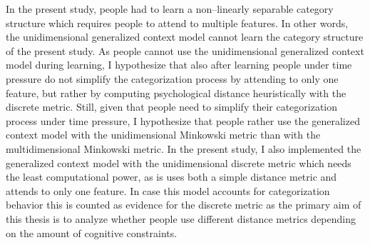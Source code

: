 \documentclass[a4paper,man,natbib]{apa6}
\begin{document}
In the present study, people had to learn a non--linearly separable category structure which requires people to attend to multiple features. In other words, the unidimensional generalized context model cannot learn the category structure of the present study. As people cannot use the unidimensional generalized context model during learning, I hypothesize that also after learning people under time pressure do not simplify the categorization process by attending to only one feature, but rather by computing psychological distance heuristically with the discrete metric. Still, given that people need to simplify their categorization process under time pressure, I hypothesize that people rather use the generalized context model with the unidimensional Minkowski metric than with the multidimensional Minkowski metric. In the present study, I also implemented the generalized context model with the unidimensional discrete metric which needs the least computational power, as is uses both a simple distance metric and attends to only one feature. In case this model accounts for categorization behavior this is counted as evidence for the discrete metric as the primary aim of this thesis is to analyze whether people use different distance metrics depending on the amount of cognitive constraints.
 
\end{document}
